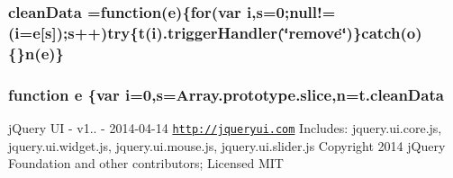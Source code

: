 \hypertarget{root_2static_2root_2js_2bootstrap_2jquery-ui-1_810_84_8custom_8min_8js_a304b1437a008590db86eff55d7998558}{
\subsubsection[{clean\-Data}]{ clean\-Data =function({\bf e})\{{\bf for}(var {\bf i},{\bf s}=0;null!=({\bf i}={\bf e}\mbox{[}{\bf s}\mbox{]});{\bf s}++){\bf try}\{{\bf t}({\bf i}).trigger\-Handler(\char`\"{}remove\char`\"{})\}catch({\bf o})\{\}{\bf n}({\bf e})\}}}\label{root_2static_2root_2js_2bootstrap_2jquery-ui-1_810_84_8custom_8min_8js_a304b1437a008590db86eff55d7998558}
\hypertarget{root_2static_2root_2js_2bootstrap_2jquery-ui-1_810_84_8custom_8min_8js_a2c038346d47955cbe2cb91e338edd7e1}{
\subsubsection[{e}]{\setlength{\rightskip}{0pt plus 5cm}function e \{var {\bf i}=0,{\bf s}=Array.\-prototype.\-slice,{\bf n}={\bf t.\-clean\-Data}}}\label{root_2static_2root_2js_2bootstrap_2jquery-ui-1_810_84_8custom_8min_8js_a2c038346d47955cbe2cb91e338edd7e1}
j\-Query U\-I -\/ v1.. -\/ 2014-\/04-\/14 \href{http://jqueryui.com}{\tt http\-://jqueryui.\-com} Includes\-: jquery.\-ui.\-core.\-js, jquery.\-ui.\-widget.\-js, jquery.\-ui.\-mouse.\-js, jquery.\-ui.\-slider.\-js Copyright 2014 j\-Query Foundation and other contributors; Licensed M\-I\-T

